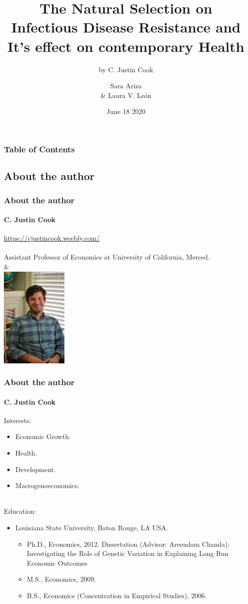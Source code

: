 \documentclass[pdftex,12pt,xcolor=pdftex,table]{beamer}
\title[Natural Selection on Infectious Disease]{The Natural Selection on Infectious Disease Resistance and It's effect on contemporary Health}
\subtitle{\footnotesize{by C. Justin Cook}}
\institute{Economic Growth and Comparative Development}
\author{Sara Ariza  \\ & Laura V. León}
\date{June 18 2020}
\theoremstyle{definition}
\theoremstyle{remark}
\numberwithin{equation}{section}
\numberwithin{figure}{section}
\begin{document}
\begin{frame}%
\titlepage
\end{frame}

\begin{frame}
\frametitle{Table of Contents}
\tableofcontents
\end{frame}


\begin{frame}\section{About the author}
\justifying
\frametitle{About the author}
\framesubtitle{C. Justin Cook}
\url{https://cjustincook.weebly.com/}\\~\\
\thinspace
Assistant Professor of Economics at University of California, Merced.\\&\\
\includegraphics[height=5cm]{autor.jpg}
\centering
\end{frame}


\begin{frame}
\frametitle{About the author}
\framesubtitle{C. Justin Cook}
\justifying
Interests:
\begin{itemize}
    \item Economic Growth.
    \item Health.
    \item Development.
    \item Macrogenoeconomics.
\end{itemize}\\

Education:
\begin{itemize}
    \item Louisiana State University, Baton Rouge, LA USA.
    \begin{itemize}
        \item Ph.D., Economics, 2012. Dissertation (Advisor: Areendam Chanda): Investigating the Role of Genetic Variation in
Explaining Long Run Economic Outcomes
       \item M.S., Economics, 2009.
       \item B.S., Economics (Concentration in Empirical Studies), 2006.

    \end{itemize}
\end{itemize}
\end{frame}
\end{document}
